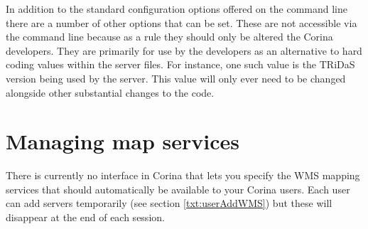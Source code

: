 In addition to the standard configuration options offered on the command line there are a number of other options that can be set.  These are not accessible via the command line because as a rule they should only be altered the Corina developers.  They are primarily for use by the developers as an alternative to hard coding values within the server files.  For instance, one such value is the TRiDaS version being used by the server.  This value will only ever need to be changed alongside other substantial changes to the code.  




\section{Managing map services}
\label{txt:managingmaps}

There is currently no interface in Corina that lets you specify the WMS mapping services that should automatically be available to your Corina users.  Each user can add servers temporarily (see section \ref{txt:userAddWMS}) but these will disappear at the end of each session.  
